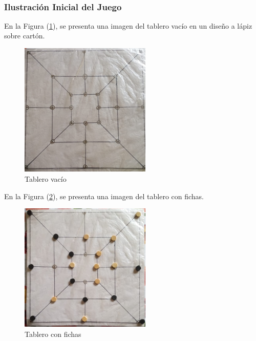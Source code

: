 ﻿﻿\documentclass{article}
\begin{document}
\subsubsection{Ilustración Inicial del Juego} \label{imagenes}

En la Figura (\ref{fig:image1}), se presenta una imagen del tablero vacío en un diseño a lápiz sobre cartón.

\begin{figure}[h]
\includegraphics[width=6.25cm]{image1.jpeg}
\centering
\caption{Tablero vacío}
\label{fig:image1}
\end{figure}

En la Figura (\ref{fig:image2}), se presenta una imagen del tablero con fichas.

\begin{figure}[h]
\includegraphics[width=6.25cm]{image2.jpeg}
\centering
\caption{Tablero con fichas}
\label{fig:image2}
\end{figure}



\end{document}
